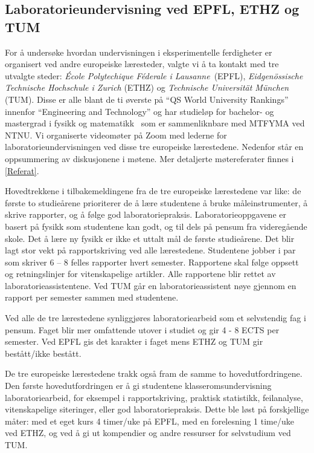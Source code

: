 \documentclass{article}
\begin{document}
\subsection{Laboratorieundervisning ved EPFL, ETHZ og TUM}
For å undersøke hvordan undervisningen i eksperimentelle ferdigheter er organisert ved andre europeiske læresteder, valgte vi å ta kontakt med tre utvalgte steder: \emph{École Polytechique Féderale i Lausanne}~(EPFL), \emph{Eidgenössische Technische Hochschule i Zurich} (ETHZ) og \emph{Technische Universität München} (TUM). Disse er alle blant de ti øverste på ``QS World University Rankings'' innenfor ``Engineering and Technology'' og har studieløp for bachelor- og mastergrad i fysikk og matematikk~\cite{ETHZprog,EPFLprog,TUMprog} som er sammenliknbare med MTFYMA ved NTNU.
Vi organiserte videomøter på Zoom med lederne for laboratorieundervisningen ved disse tre europeiske lærestedene. Nedenfor står en oppsummering av diskusjonene i møtene. Mer detaljerte møtereferater finnes i \cref{Referat}.

Hovedtrekkene i tilbakemeldingene fra de tre europeiske lærestedene var like: de første to studieårene prioriterer de å lære studentene å bruke måleinstrumenter, å skrive rapporter, og å følge god laboratoriepraksis. Laboratorieoppgavene er basert på fysikk som studentene kan godt, og til dels på pensum fra videregående skole. Det å lære ny fysikk er ikke et uttalt mål de første studieårene. Det blir lagt stor vekt på rapportskriving ved alle lærestedene. Studentene jobber i par som skriver 6 – 8 felles rapporter hvert semester. Rapportene skal følge oppsett og retningslinjer for vitenskapelige artikler. Alle rapportene blir rettet av laboratorieassistentene. Ved TUM går en laboratorieassistent nøye gjennom en rapport per semester sammen med studentene.

Ved alle de tre lærestedene synliggjøres laboratoriearbeid som et selvstendig fag i pensum. Faget blir mer omfattende utover i studiet og gir 4 - 8 ECTS per semester. Ved EPFL gis det karakter i faget mens ETHZ og TUM gir bestått/ikke bestått.

De tre europeiske lærestedene trakk også fram de samme to hovedutfordringene. Den første hovedutfordringen er å gi studentene klasseromsundervisning laboratoriearbeid, for eksempel i rapportskriving, praktisk statistikk, feilanalyse, vitenskapelige siteringer, eller god laboratoriepraksis. Dette ble løst på forskjellige måter: med et eget kurs 4 timer/uke på EPFL, med en forelesning 1 time/uke ved ETHZ, og ved å gi ut kompendier og andre ressurser for selvstudium ved TUM.
\end{document}
